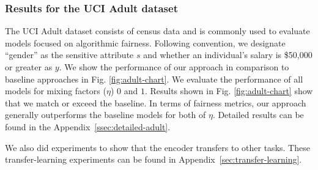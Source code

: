 \subsubsection{Results for the UCI Adult dataset}
The UCI Adult dataset consists of census data and is commonly used to evaluate models focused on algorithmic fairness.
Following convention, we designate ``gender'' as the sensitive attribute $s$ and whether an individual's salary is \$50,000 or greater as $y$.
We show the performance of our approach in comparison to baseline approaches in Fig. \ref{fig:adult-chart}.
We evaluate the performance of all models for mixing factors ($\eta$) $0$ and $1$. 
Results shown in Fig. \ref{fig:adult-chart} show that
we match or exceed the baseline.
In terms of fairness metrics, our approach generally outperforms the baseline models for both of $\eta$.
Detailed results can be found in the Appendix~\ref{ssec:detailed-adult}.

We also did experiments to show that the encoder transfers to other tasks. These transfer-learning experiments can be found in Appendix~\ref{sec:transfer-learning}.


